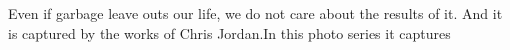 Even if garbage leave outs our life, we do not care about the results of it. And it is captured by the works of Chris Jordan.In this photo series it captures 














